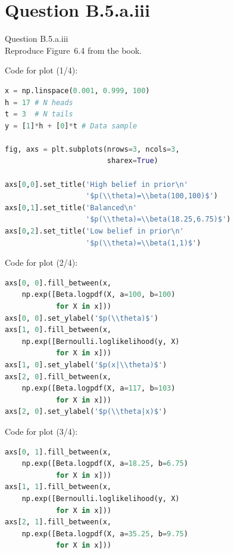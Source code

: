\documentclass[usenames,dvipsnames,table]{beamer}
\begin{document}
\section{Question B.5.a.iii}
\begin{frame}
\begin{center}
{\huge{Question B.5.a.iii}}
\\\vspace{2em}
Reproduce Figure~6.4 from the book.
\end{center}
\end{frame}

\begin{frame}[fragile]
Code for plot (1/4):
\begin{lstlisting}[language=Python]
x = np.linspace(0.001, 0.999, 100)
h = 17 # N heads
t = 3  # N tails
y = [1]*h + [0]*t # Data sample

fig, axs = plt.subplots(nrows=3, ncols=3,
                        sharex=True)

axs[0,0].set_title('High belief in prior\n'
                   '$p(\\theta)=\\beta(100,100)$')
axs[0,1].set_title('Balanced\n'
                   '$p(\\theta)=\\beta(18.25,6.75)$')
axs[0,2].set_title('Low belief in prior\n'
                   '$p(\\theta)=\\beta(1,1)$')
\end{lstlisting}
\end{frame}

\begin{frame}[fragile]
Code for plot (2/4):
\begin{lstlisting}[language=Python]
axs[0, 0].fill_between(x,
    np.exp([Beta.logpdf(X, a=100, b=100)
            for X in x]))
axs[0, 0].set_ylabel('$p(\\theta)$')
axs[1, 0].fill_between(x,
    np.exp([Bernoulli.loglikelihood(y, X)
            for X in x]))
axs[1, 0].set_ylabel('$p(x|\\theta)$')
axs[2, 0].fill_between(x,
    np.exp([Beta.logpdf(X, a=117, b=103)
            for X in x]))
axs[2, 0].set_ylabel('$p(\\theta|x)$')
\end{lstlisting}
\end{frame}

\begin{frame}[fragile]
Code for plot (3/4):
\begin{lstlisting}[language=Python]
axs[0, 1].fill_between(x,
    np.exp([Beta.logpdf(X, a=18.25, b=6.75)
            for X in x]))
axs[1, 1].fill_between(x,
    np.exp([Bernoulli.loglikelihood(y, X)
            for X in x]))
axs[2, 1].fill_between(x,
    np.exp([Beta.logpdf(X, a=35.25, b=9.75)
            for X in x]))
\end{lstlisting}
\end{frame}
\end{document}
